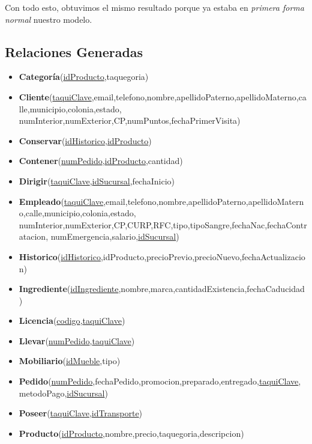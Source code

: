 \documentclass[11pt,letterpaper]{article}
\begin{document}
Con todo esto, obtuvimos el mismo resultado porque ya estaba en \textit{primera forma normal} nuestro modelo.

\subsection{Relaciones Generadas}
\begin{itemize}
\item \footnotesize{\textbf{Categoría}(\underline{idProducto},taquegoria)}
\item \footnotesize{\textbf{Cliente}(\underline{taquiClave},email,telefono,nombre,apellidoPaterno,apellidoMaterno,calle,municipio,colonia,estado,
numInterior,numExterior,CP,numPuntos,fechaPrimerVisita)}
\item \footnotesize{\textbf{Conservar}(\underline{idHistorico},\underline{idProducto})}
\item \footnotesize{\textbf{Contener}(\underline{numPedido},\underline{idProducto},cantidad)}
\item \footnotesize{\textbf{Dirigir}(\underline{taquiClave},\underline{idSucursal},fechaInicio)}
\item \footnotesize{\textbf{Empleado}(\underline{taquiClave},email,telefono,nombre,apellidoPaterno,apellidoMaterno,calle,municipio,colonia,estado,
numInterior,numExterior,CP,CURP,RFC,tipo,tipoSangre,fechaNac,fechaContratacion,
numEmergencia,salario,\underline{idSucursal})}
\item \footnotesize{\textbf{Historico}(\underline{idHistorico},idProducto,precioPrevio,precioNuevo,fechaActualizacion)}
\item \footnotesize{\textbf{Ingrediente}(\underline{idIngrediente},nombre,marca,cantidadExistencia,fechaCaducidad)}
\item \footnotesize{\textbf{Licencia}(\underline{codigo},\underline{taquiClave}})
\item \footnotesize{\textbf{Llevar}(\underline{numPedido},\underline{taquiClave})}
\item \footnotesize{\textbf{Mobiliario}(\underline{idMueble},tipo)}
\item \footnotesize{\textbf{Pedido}(\underline{numPedido},fechaPedido,promocion,preparado,entregado,\underline{taquiClave},metodoPago,\underline{idSucursal})}
\item \footnotesize{\textbf{Poseer}(\underline{taquiClave},\underline{idTransporte})}
\item \footnotesize{\textbf{Producto}(\underline{idProducto},nombre,precio,taquegoria,descripcion)}

\end{itemize}
\end{document}
